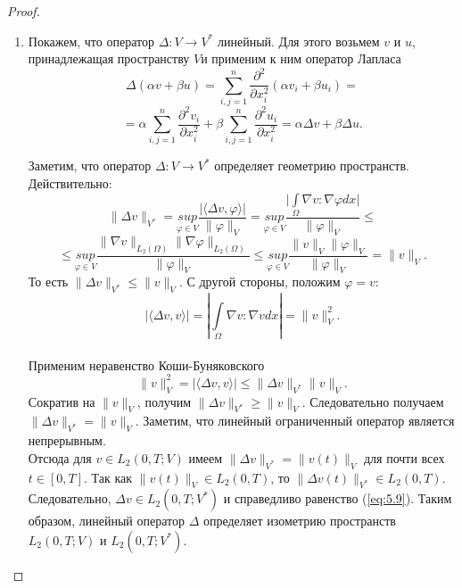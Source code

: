 \begin{proof} ~\\
    \begin{enumerate}
        \item Покажем, что оператор $\Delta : V\rightarrow V^*$ линейный.
        Для этого возьмем $v$ и $u$, принадлежащая пространству $V$и применим к ним оператор Лапласа
        $$\Delta (\alpha v+\beta u)= \sum_{i,j=1}^{n} \frac{\partial^2}{\partial x_i^2} (\alpha v_i+\beta u_i)=$$
        $$=\alpha \sum_{i,j=1}^{n} \frac{\partial^2 v_i}{\partial x_i^2}+\beta \sum_{i,j=1}^{n} \frac{\partial^2 u_i}{\partial x_i^2}=\alpha\Delta v+\beta\Delta u.$$

        Заметим, что оператор $\Delta : V\rightarrow V^*$ определяет геометрию пространств. Действительно:
        $$\| \Delta v \|_{V^*}=\underset{\varphi\in V}{sup} \frac{|\langle \Delta v,\varphi \rangle|}{\| \varphi\|_V}=\underset{\varphi\in V}{sup}
        \frac{\bigg|\int\limits_{\Omega}\nabla v:\nabla\varphi dx\bigg|}{\| \varphi\|_V}\le$$
        $$\le\underset{\varphi\in V}{sup} \frac{\|\nabla v\|_{L_2(\Omega)}\|\nabla \varphi\|_{L_2(\Omega)}}{\|\varphi\|_V}
        \le\underset{\varphi\in V}{sup} \frac{\| v \|_{V} \| \varphi \|_{V}}{\| \varphi \|_{V}}=\| v \|_{V}.$$
        То есть $\| \Delta v \|_{V^*}\le\| v \|_{V}.$ С другой стороны, положим $\varphi=v:$\\
        $$|\langle \Delta v,v \rangle|=|\int\limits_{\Omega}\nabla v:\nabla v dx|=\|v\|_V^2.$$\\
        Применим неравенство Коши-Буняковского
        $$\|v\|_V^2=|\langle \Delta v,v\rangle|\le\|\Delta v\|_{V^*}\| v\|_{V}.$$
        Сократив на $\|v\|_V$, получим $\|\Delta v\|_{V^*}\ge\|v\|_V.$
        Следовательно получаем $\|\Delta v\|_{V^*}=\|v\|_V.$
        Заметим, что линейный ограниченный оператор является непрерывным.\\
        Отсюда для $v \in L_2(0, T; V)$ имеем
        $\| \Delta v \|_{V^\ast} = \| v(t) \|_V$ для почти всех\linebreak$t \in [0, T]$. Так как $\| v(t) \|_V \in L_2(0, T)$,
        то $\| \Delta v(t)\|_{V^*} \in L_2(0, T)$. Следовательно, $\Delta v \in L_2(0, T; V^\ast)$ и справедливо
        равенство (\ref{eq:5.9}). Таким образом, линейный оператор $\Delta$ определяет изометрию пространств $L_2(0, T; V)$ и $L_2(0, T; V^\ast)$.
        \clearpage


\end{enumerate}
\end{proof}
